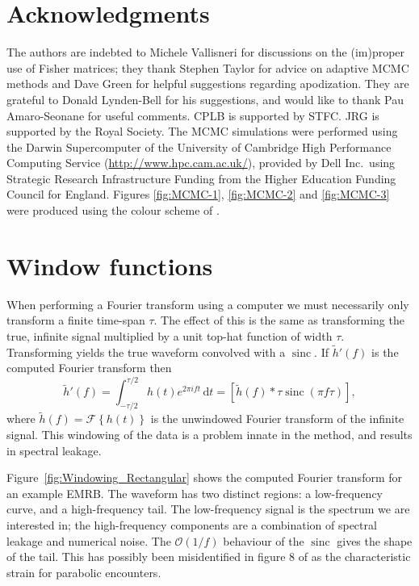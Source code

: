 \documentclass[useAMS,usedcolumn,usegraphicx,usenatbib]{mn2e}
\newcommand{\Figref}[1]{Figure~\ref{fig:#1}}
\DeclareMathOperator{\sinc}{sinc}
\newcommand{\dd}{\ensuremath{\mathrm{d}}}
\newcommand{\intd}[4]{\ensuremath{\int_{#1}^{#2}{#3}\,\dd{#4}}}
\newcommand{\order}[1]{\ensuremath{\mathcal{O}({#1})}}
\begin{document}
\section*{Acknowledgments}

The authors are indebted to Michele Vallisneri for discussions on the (im)proper use of Fisher matrices; they thank Stephen Taylor for advice on adaptive MCMC methods and Dave Green for helpful suggestions regarding apodization. They are grateful to Donald Lynden-Bell for his suggestions, and would like to thank Pau Amaro-Seonane for useful comments. CPLB is supported by STFC. JRG is supported by the Royal Society. The MCMC simulations were performed using the Darwin Supercomputer of the University of Cambridge High Performance Computing Service (\url{http://www.hpc.cam.ac.uk/}), provided by Dell Inc.\ using Strategic Research Infrastructure Funding from the Higher Education Funding Council for England. Figures \ref{fig:MCMC-1}, \ref{fig:MCMC-2} and \ref{fig:MCMC-3} were produced using the colour scheme of \citet{Green2011}.




\appendix

\section{Window functions}\label{ap:window}

When performing a Fourier transform using a computer we must necessarily only transform a finite time-span $\tau$. The effect of this is the same as transforming the true, infinite signal multiplied by a unit top-hat function of width $\tau$. Transforming yields the true waveform convolved with a $\sinc$. If $\tilde{h}'(f)$ is the computed Fourier transform then
\begin{equation}
\tilde{h}'(f) = \intd{-\tau/2}{\tau/2}{h(t)e^{2\pi i ft}}{t} = \left[\tilde{h}(f) \ast \tau \sinc(\pi f\tau)\right],
\end{equation}
where $\tilde{h}(f) = \mathscr{F}\left\{h(t)\right\}$ is the unwindowed Fourier transform of the infinite signal. This windowing of the data is a problem innate in the method, and results in spectral leakage.

\Figref{Windowing_Rectangular} shows the computed Fourier transform for an example EMRB. The waveform has two distinct regions: a low-frequency curve, and a high-frequency tail. The low-frequency signal is the spectrum we are interested in; the high-frequency components are a combination of spectral leakage and numerical noise. The $\order{1/{f}}$ behaviour of the $\sinc$ gives the shape of the tail. This has possibly been misidentified in figure 8 of \citet{Burko2007} as the characteristic strain for parabolic encounters.
\end{document}

